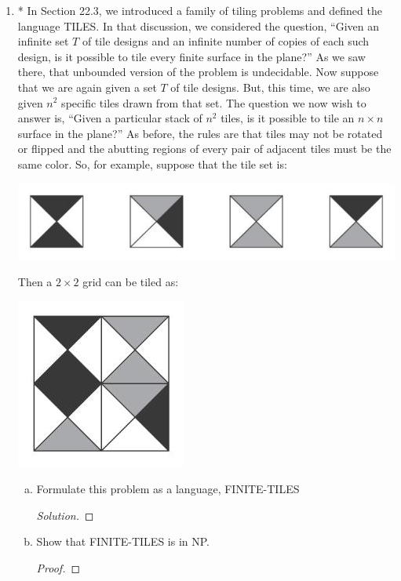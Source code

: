 \documentclass[10pt]{article}
\begin{document}
\begin{enumerate}[1)]
\item
* In Section 22.3, we introduced a family of tiling problems and defined the language TILES.  In that discussion, we considered the question, “Given an infinite set $T$ of tile designs and an infinite number of copies of each such design, is it possible to tile every finite surface in the plane?”  As we saw there, that unbounded version of the problem is undecidable.  Now suppose that we are again given a set $T$ of tile designs.  But, this time, we are also given $n^2$ specific tiles drawn from that set.  The question we now wish to answer is, “Given a particular stack of $n^2$ tiles, is it possible to tile an $n \times n$ surface in the plane?”  As before, the rules are that tiles may not be rotated or flipped and the abutting regions of every pair of adjacent tiles must be the same color.  So, for example, suppose that the tile set is:\\
\begin{center}
\includegraphics[scale=.5]{images/tileset.jpg}
\end{center}
Then a $2 \times 2$ grid can be tiled as:\\
\begin{center}
\includegraphics[scale=.5]{images/tiling.jpg}
\end{center}
\begin{enumerate}[a)]
\item
Formulate this problem as a language, FINITE-TILES
\begin{proof}[Solution]
\end{proof}
\item
Show that FINITE-TILES is in NP.
\begin{proof}[Proof]
\end{proof}
\end{enumerate}
\end{enumerate}
\end{document}
